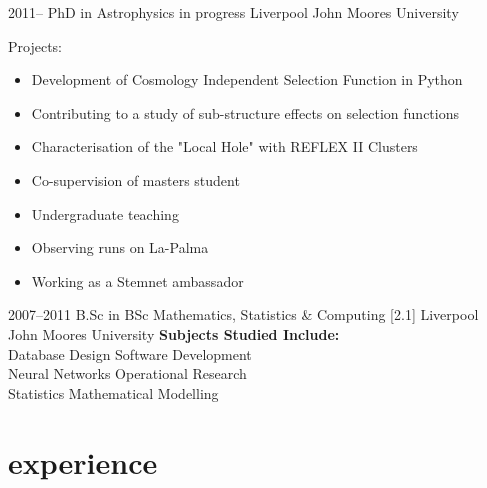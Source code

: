 \documentclass[]{cv-style}          %
\begin{document}
\begin{entrylist}
\entry
{2011--}
{PhD {\normalfont in Astrophysics in progress}}
{Liverpool John Moores University}
{
Projects:
\begin{itemize}
    \item Development of Cosmology Independent Selection Function in Python
    \item Contributing to a study of sub-structure effects on selection functions
    \item Characterisation of the "Local Hole" with REFLEX II Clusters
    \item Co-supervision of masters student
    \item Undergraduate teaching
    \item Observing runs on La-Palma
    \item Working as a Stemnet ambassador
  \end{itemize}
}
{\vspace{-0.3cm}}
\entry
{2007--2011}
{B.Sc {\normalfont in BSc Mathematics, Statistics \& Computing [2.1]}}
{Liverpool John Moores University}
  {
\textbf{Subjects Studied Include:}\\
{\quad Database Design \qquad Software Development\\}
{\qquad Neural Networks \qquad Operational Research\\}
{\qquad Statistics \qquad \qquad \quad Mathematical Modelling\\}
  }
\end{entrylist}

\section{experience}
\end{document}
